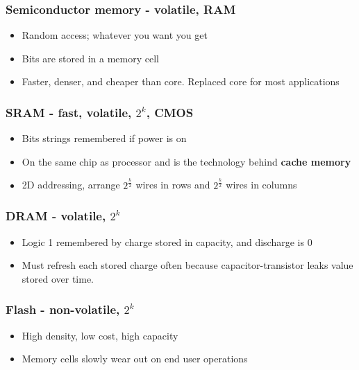 \documentclass{article}
\begin{document}
\subsubsection{Semiconductor memory - volatile, RAM}
\begin{itemize}
\item Random access; whatever you want you get
    \item Bits are stored in a memory cell
    \item Faster, denser, and cheaper than core. Replaced core for most applications
\end{itemize}

\subsubsection{SRAM - fast, volatile, $2^k$, CMOS}

\begin{itemize}
    \item Bits strings remembered if power is on 
    \item On the same chip as processor and is the technology behind \textbf{cache memory}
    \item 2D addressing, arrange $2^\frac{k}{2}$ wires in rows and $2^\frac{k}{2}$ wires in columns 
\end{itemize}

\subsubsection{DRAM - volatile, $2^k$}

\begin{itemize}
    \item Logic 1 remembered by charge stored in capacity, and discharge is 0
    
    \item Must refresh each stored charge often because capacitor-transistor leaks value stored over time. 
\end{itemize}

\subsubsection{Flash - non-volatile, $2^k$}

\begin{itemize}
    \item High density, low cost, high capacity
    
    \item Memory cells slowly wear out on end user operations
\end{itemize}
\end{document}

